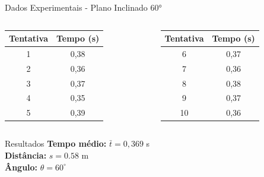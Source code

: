 \documentclass[12pt]{beamer}
\begin{document}
\begin{frame}{Dados Experimentais - Plano Inclinado 60°}
    \small
    \begin{columns}
        \begin{column}{0.5\textwidth}
            \begin{table}
                \centering
                \begin{tabular}{|c|c|}
                    \hline
                    \textbf{Tentativa} & \textbf{Tempo (s)} \\
                    \hline
                    1                  & 0,38               \\
                    2                  & 0,36               \\
                    3                  & 0,37               \\
                    4                  & 0,35               \\
                    5                  & 0,39               \\
                    \hline
                \end{tabular}
            \end{table}
        \end{column}
        \begin{column}{0.5\textwidth}
            \begin{table}
                \centering
                \begin{tabular}{|c|c|}
                    \hline
                    \textbf{Tentativa} & \textbf{Tempo (s)} \\
                    \hline
                    6                  & 0,37               \\
                    7                  & 0,36               \\
                    8                  & 0,38               \\
                    9                  & 0,37               \\
                    10                 & 0,36               \\
                    \hline
                \end{tabular}
            \end{table}
        \end{column}
    \end{columns}

    \vspace{0.3cm}
    \begin{block}{Resultados}
        \centering
        \textbf{Tempo médio:} $\bar{t} = 0,369$ s \\
        \textbf{Distância:} $s = 0.58$ m \\
        \textbf{Ângulo:} $\theta = 60^\circ$
    \end{block}
\end{frame}
\end{document}
